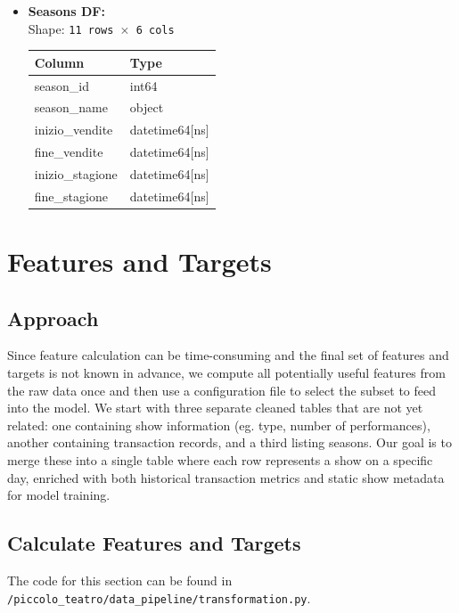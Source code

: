 \documentclass[a4paper,12pt]{report}  %
\begin{document}
\begin{itemize}
  \item \textbf{Seasons DF:}\\[-0.5ex]
        Shape: \texttt{11 rows $\times$ 6 cols}\\[1ex]
        \begin{tabular}{@{}ll@{}}
          \toprule
          \textbf{Column}       & \textbf{Type}       \\
          \midrule
          season\_id            & int64               \\
          season\_name          & object              \\
          inizio\_vendite       & datetime64[ns]      \\
          fine\_vendite         & datetime64[ns]      \\
          inizio\_stagione      & datetime64[ns]      \\
          fine\_stagione        & datetime64[ns]      \\
          \bottomrule
        \end{tabular}
\end{itemize}

\section{Features and Targets}
\subsection{Approach}
Since feature calculation can be time-consuming and the final set of features and targets is not known in advance, we compute all potentially useful features from the raw data once and then use a configuration file to select the subset to feed into the model. We start with three separate cleaned tables that are not yet related: one containing show information (eg. type, number of performances), another containing transaction records, and a third listing seasons. Our goal is to merge these into a single table where each row represents a show on a specific day, enriched with both historical transaction metrics and static show metadata for model training.

\subsection{Calculate Features and Targets}
The code for this section can be found in
\verb|/piccolo_teatro/data_pipeline/transformation.py|.
\end{document}
